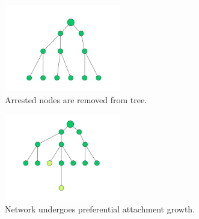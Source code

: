\documentclass[11pt]{article}
\begin{document}
\begin{figure}
\quad
 \begin{subfigure}[t]{0.3\textwidth}\centering
\includegraphics[width = 2in]{4.pdf}
\caption{Arrested nodes are removed from tree.}\end{subfigure}
\quad
 \begin{subfigure}[t]{0.3\textwidth}\centering
\includegraphics[width = 2in]{5.pdf}
\caption{Network undergoes preferential attachment growth.}\end{subfigure}
\hspace{1in}
\caption{}
\end{figure}
\end{document}
